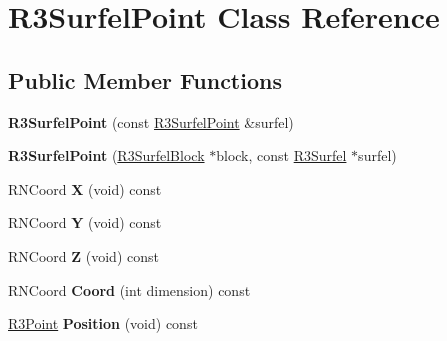 \hypertarget{class_r3_surfel_point}{}\section{R3\+Surfel\+Point Class Reference}
\label{class_r3_surfel_point}
\subsection*{Public Member Functions}
\begin{DoxyCompactItemize}
\item 
{\bfseries R3\+Surfel\+Point} (const \hyperlink{class_r3_surfel_point}{R3\+Surfel\+Point} \&surfel)\hypertarget{class_r3_surfel_point_a27c769e8d26f20bdf4c060c4c34578a9}{}\label{class_r3_surfel_point_a27c769e8d26f20bdf4c060c4c34578a9}

\item 
{\bfseries R3\+Surfel\+Point} (\hyperlink{class_r3_surfel_block}{R3\+Surfel\+Block} $\ast$block, const \hyperlink{class_r3_surfel}{R3\+Surfel} $\ast$surfel)\hypertarget{class_r3_surfel_point_adb3c5f960e0d6876a15cf21664bfdb47}{}\label{class_r3_surfel_point_adb3c5f960e0d6876a15cf21664bfdb47}

\item 
R\+N\+Coord {\bfseries X} (void) const \hypertarget{class_r3_surfel_point_a01fca67786661e0f244deededeea8a88}{}\label{class_r3_surfel_point_a01fca67786661e0f244deededeea8a88}

\item 
R\+N\+Coord {\bfseries Y} (void) const \hypertarget{class_r3_surfel_point_a98c6798e5ff284741f61d68d2dc6a438}{}\label{class_r3_surfel_point_a98c6798e5ff284741f61d68d2dc6a438}

\item 
R\+N\+Coord {\bfseries Z} (void) const \hypertarget{class_r3_surfel_point_add8271d77679828e74a51ef41bfbf71c}{}\label{class_r3_surfel_point_add8271d77679828e74a51ef41bfbf71c}

\item 
R\+N\+Coord {\bfseries Coord} (int dimension) const \hypertarget{class_r3_surfel_point_a9f12364263f1aa0f30b8e6a10b5e3f22}{}\label{class_r3_surfel_point_a9f12364263f1aa0f30b8e6a10b5e3f22}

\item 
\hyperlink{class_r3_point}{R3\+Point} {\bfseries Position} (void) const \hypertarget{class_r3_surfel_point_ae7691584268e15c530c4e773a059e976}{}\label{class_r3_surfel_point_ae7691584268e15c530c4e773a059e976}


\end{DoxyCompactItemize}
